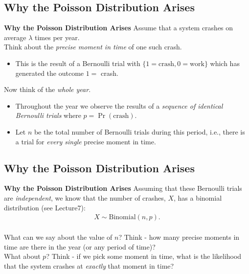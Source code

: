 \documentclass[compress]{beamer}        %
\makeatletter
\newcommand{\tcb}{\textcolor{beamer@blendedblue}}
\makeatother
\begin{document}
\subsection{Why the Poisson Distribution Arises}
\begin{frame}{\bf \tcb{Why the Poisson Distribution Arises}}
Assume that a system crashes on average $\lambda$ times per year.\\[0.8cm]
Think about the \emph{precise moment in time} of one such crash.\\[0.0cm]
\begin{itemize}
\item This is the result of a Bernoulli trial with $\{1= \text{crash}, 0= \text{work}\}$ which has generated the outcome $1=$ crash.\\[0.8cm]
\end{itemize}

Now think of the \emph{whole year}.\\
\begin{itemize}
\item Throughout the year we observe the results of a \emph{sequence of identical Bernoulli trials} where $p =\Pr(\text{crash})$.\\[0.4cm]
\item Let $n$ be the total number of Bernoulli trials during this period, i.e., there is a trial for \emph{every single} precise moment in time.
\end{itemize}

\end{frame}


\subsection{Why the Poisson Distribution Arises}
\begin{frame}{\bf \tcb{Why the Poisson Distribution Arises}}
Assuming that these Bernoulli trials are \emph{independent}, we know that the number of crashes, $X$, has a binomial distribution (see Lecture7):\\
\begin{align*}
X \sim \text{Binomial}(n,p).\\
\end{align*}

What can we say about the value of $n$? Think - how many precise moments in time are there in the year (or any period of time)?\\[0.8cm]

What about $p$? Think - if we pick some moment in time, what is the likelihood that the system crashes at \emph{exactly} that moment in time?

\end{frame}
\end{document}

